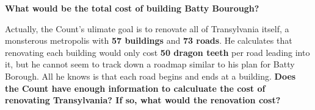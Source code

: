 \begin{center}
\end{center}

\noindent\textbf{What would be the total cost of building Batty Bourough?}


\vspace{3em}

Actually, the Count's ulimate goal is to renovate all of Transylvania itself,
a monsterous metropolis with \textbf{57 buildings} and \textbf{73 roads}.
He calculates that renovating each building would only cost
\textbf{50 dragon teeth}
per road leading into it, but he cannot seem to track down a roadmap
similar to his plan for Batty Borough. All he knows is that each road
begins and ends at a building.
\textbf{Does the
Count have enough information to calculuate the cost of renovating
Transylvania? If so, what would the renovation cost?}
